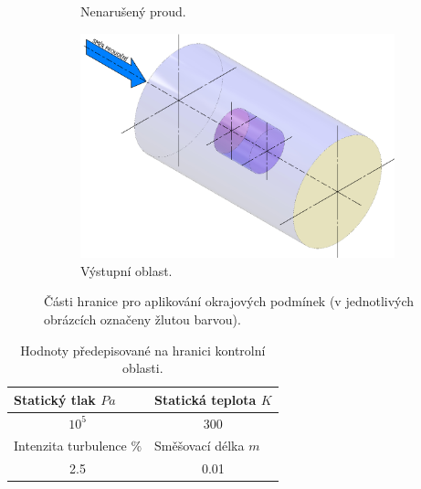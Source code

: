 \begin{figure}[ht!]
\begin{subfigure}{0.3\textwidth}
                             \caption{Nenarušený proud.}
                             \label{fig:farfield}
                         \end{subfigure}
					\begin{subfigure}{0.3\textwidth}
                             \centering
                             \captionsetup{width=.9\linewidth}
                             \includegraphics[width=\textwidth]{300_VYPOCETNI_MODEL/op-outlet.png}
                             \caption{Výstupní oblast.}
                             \label{fig:outlet}
                         \end{subfigure}
                    \caption{Části hranice pro aplikování okrajových podmínek (v jednotlivých obrázcích označeny žlutou barvou).}
                    \label{fig:okrajove-podminky}
         \end{figure}

         \begin{table}[ht!]
            \centering
            \caption{Hodnoty předepisované na hranici kontrolní oblasti.}
            \begin{tabular}{l|l}
                Statický tlak $\unit{Pa}$       & Statická teplota $\unit{K}$ \\ \hline
                \multicolumn{1}{c|}{$10^{5}$}    & \multicolumn{1}{c}{300}     \\ \hline
                Intenzita turbulence $\unit{\%}$ & Směšovací délka $\unit{m}$  \\ \hline
                \multicolumn{1}{c|}{2.5}         & \multicolumn{1}{c}{0.01}   
            \end{tabular}%
            \label{tab:spolecne-op}
        \end{table}


